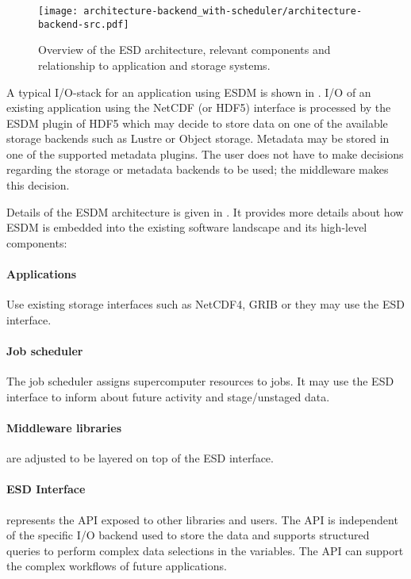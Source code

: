 \begin{figure}[bp]
	\centering
	\texttt{[image: architecture-backend\_with-scheduler/architecture-backend-src.pdf]}
	\caption{Overview of the ESD architecture, relevant components and relationship to application and storage systems.}
	\label{fig:architecture}
\end{figure}

A typical I/O-stack for an application using ESDM is shown in .
I/O of an existing application using the NetCDF (or HDF5) interface is processed by the ESDM plugin of HDF5 which may decide to store data on one of the available
storage backends such as Lustre or Object storage.
Metadata may be stored in one of the supported metadata plugins.
The user does not have to make decisions regarding the storage or metadata backends to be used; the middleware makes this decision.

\bigskip


Details of the ESDM architecture is given in .
It provides more details about how ESDM is embedded into the existing software landscape and its high-level components:

\paragraph{Applications}
Use existing storage interfaces such as NetCDF4, GRIB or they may use the ESD interface.

\paragraph{Job scheduler}
The job scheduler assigns supercomputer resources to jobs.
It may use the ESD interface to inform about future activity and stage/unstaged data.


\paragraph{Middleware libraries} are adjusted to be layered on top of the ESD interface.


\paragraph{ESD Interface}
represents the API exposed to other libraries and users.
The API is independent of the specific I/O backend used to store the data and supports structured queries to perform complex data selections in the variables.
The API can support the complex workflows of future applications.

